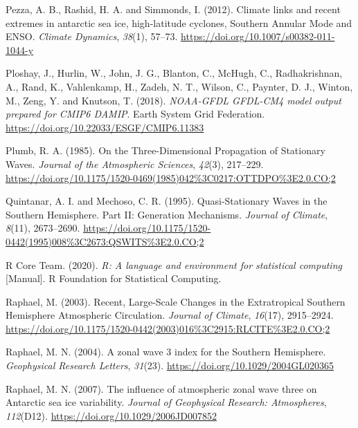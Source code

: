 \documentclass[12pt,oneside,a4paper]{reedthesis}
\newlength{\cslhangindent}
\newenvironment{CSLReferences}[2] %
 {%
  \setlength{\parindent}{0pt}
  \ifodd #1 \everypar{\setlength{\hangindent}{\cslhangindent}}\ignorespaces\fi
  \ifnum #2 > 0
  \setlength{\parskip}{#2\baselineskip}
  \fi
 }%
 {}
\begin{document}
\begin{CSLReferences}{1}{0}
\leavevmode{}%
Pezza, A. B., Rashid, H. A. and Simmonds, I. (2012). Climate links and recent extremes in antarctic sea ice, high-latitude cyclones, {Southern Annular Mode} and {ENSO}. \emph{Climate Dynamics}, \emph{38}(1), 57--73. \url{https://doi.org/10.1007/s00382-011-1044-y}

\leavevmode{}%
Ploshay, J., Hurlin, W., John, J. G., Blanton, C., McHugh, C., Radhakrishnan, A., Rand, K., Vahlenkamp, H., Zadeh, N. T., Wilson, C., Paynter, D. J., Winton, M., Zeng, Y. and Knutson, T. (2018). \emph{NOAA-GFDL GFDL-CM4 model output prepared for CMIP6 DAMIP}. Earth System Grid Federation. \url{https://doi.org/10.22033/ESGF/CMIP6.11383}

\leavevmode{}%
Plumb, R. A. (1985). On the {Three-Dimensional Propagation} of {Stationary Waves}. \emph{Journal of the Atmospheric Sciences}, \emph{42}(3), 217--229. \url{https://doi.org/10.1175/1520-0469(1985)042\%3C0217:OTTDPO\%3E2.0.CO;2}

\leavevmode{}%
Quintanar, A. I. and Mechoso, C. R. (1995). Quasi-{Stationary Waves} in the {Southern Hemisphere}. {Part II}: {Generation Mechanisms}. \emph{Journal of Climate}, \emph{8}(11), 2673--2690. \url{https://doi.org/10.1175/1520-0442(1995)008\%3C2673:QSWITS\%3E2.0.CO;2}

\leavevmode{}%
R Core Team. (2020). \emph{R: {A} language and environment for statistical computing} {[}Manual{]}. {R Foundation for Statistical Computing}.

\leavevmode{}%
Raphael, M. (2003). Recent, {Large-Scale Changes} in the {Extratropical Southern Hemisphere Atmospheric Circulation}. \emph{Journal of Climate}, \emph{16}(17), 2915--2924. \url{https://doi.org/10.1175/1520-0442(2003)016\%3C2915:RLCITE\%3E2.0.CO;2}

\leavevmode{}%
Raphael, M. N. (2004). A zonal wave 3 index for the {Southern Hemisphere}. \emph{Geophysical Research Letters}, \emph{31}(23). \url{https://doi.org/10.1029/2004GL020365}

\leavevmode{}%
Raphael, M. N. (2007). The influence of atmospheric zonal wave three on {Antarctic} sea ice variability. \emph{Journal of Geophysical Research: Atmospheres}, \emph{112}(D12). \url{https://doi.org/10.1029/2006JD007852}


\end{CSLReferences}
\end{document}
